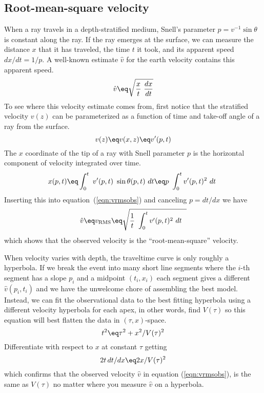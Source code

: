 \subsection{Root-mean-square velocity}
When a ray travels in a depth-stratified medium,
Snell's parameter $p=v^{-1}\sin\theta$ is constant along the ray.
If the ray emerges at the surface,
we can measure the distance $x$ that it has traveled,
the time $t$ it took, and its apparent speed $dx/dt=1/p$.
A well-known estimate $\hat v$
for the earth velocity contains this apparent speed.
\begin{equation}
\hat v \eq \sqrt{ {x\over t} \ {dx\over dt} }
\label{eqn:vrmsobs}
\end{equation}
To see where this velocity estimate comes from,
first notice that the stratified velocity $v(z)$ can be parameterized
as a function of time and take-off angle of a ray from the surface.
\begin{equation}
v(z) \eq v(x,z) \eq v'(p,t)
\end{equation}
The $x$ coordinate of the tip of a ray with Snell parameter $p$ is
the horizontal component of velocity integrated over time.
\begin{equation}
x(p,t) \eq \int_0^t \ v'(p,t) \ \sin\theta(p,t)\ dt
       \eq p\ \int_0^t v'(p,t)^2\ dt \ 
\end{equation}
Inserting this into equation~(\ref{eqn:vrmsobs})
and canceling $p=dt/dx$ we have
\begin{equation}
\hat v \eq
v_\RMS \eq \sqrt{ {1\over t} \ \int_0^t v'(p,t)^2\ dt\ \ }
\label{eqn:vrmsdefine}
\end{equation}
which shows that the observed velocity is the ``root-mean-square'' velocity.

\par
When velocity varies with depth,
the traveltime curve is only roughly a hyperbola.
If we break the event into many short line segments where the
$i$-th segment has a slope $p_i$ and a midpoint $(t_i,x_i)$
each segment gives a different $\hat v(p_i,t_i)$
and we have the unwelcome chore of assembling the best model.
Instead, we can fit the observational data to the best fitting hyperbola
using a different velocity hyperbola for each apex,
in other words,
find $V(\tau )$ so this equation
will best flatten the data in $(\tau,x)$-space.
\begin{equation}
t^2 \eq \tau^2 + x^2/V(\tau)^2
\end{equation}
Differentiate with respect to $x$ at constant $\tau$ getting
\begin{equation}
2t\, dt/dx \eq 2x/V(\tau)^2
\end{equation}
which confirms that the observed velocity
$\hat v$ in equation (\ref{eqn:vrmsobs}),
is the same as $V(\tau )$ no matter where you measure
$\hat v$ on a hyperbola.

